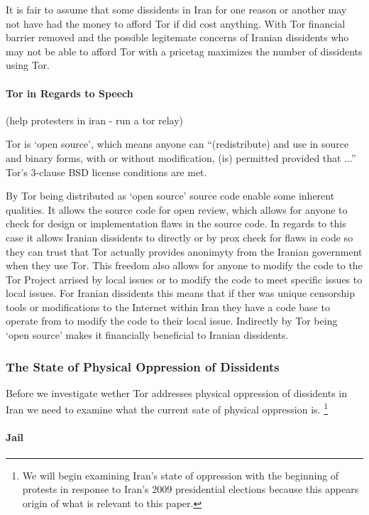 \documentclass[11pt]{article}
\begin{document}
\begin{multicols}{2}
It is fair to assume that some dissidents in Iran for one reason or another may
not have had the money to afford Tor if did cost anything. With Tor financial
barrier removed and the possible legitemate concerns of Iranian dissidents who
may not be able to afford Tor with a pricetag maximizes the number of dissidents
using Tor.

\paragraph{Tor in Regards to Speech}
(help protesters in iran - run a tor relay)

Tor is `open source', which means anyone can ``(redistribute) and use in source and
binary forms, with or without modification, (is) permitted provided that ...'' 
Tor's 3-clause BSD license conditions are met. \cite{BSD:3-ClauseLicense,
TOR:Download, TOR:BSD-License} 

By Tor being distributed as `open source' source code enable some inherent
qualities. It allows the source code for open review, which allows for anyone to
check for design or implementation flaws in the source code. In regards to this
case it allows Iranian dissidents to directly or by prox check for flaws in code
so they can trust that Tor actually provides anonimyty from the Iranian
government when they use Tor. This freedom also allows for anyone to modify the
code to the Tor Project arrised by local issues or to modify the code to meet
specific issues to local issues. For Iranian dissidents this means that if ther
was unique censorship tools or modifications to the Internet within Iran they
have a code base to operate from to modify the code to their local issue.
Indirectly by Tor being `open source' makes it financially beneficial to Iranian
dissidents.

\subsubsection{The State of Physical Oppression of Dissidents}
Before we investigate wether Tor addresses physical oppression of dissidents in
Iran we need to examine what the current sate of physical oppression is.
\footnote{We will begin examining Iran's state of oppression with the beginning
of protests in response to Iran's 2009 presidential elections because this
appears origin of what is relevant to this paper.}

\paragraph{Jail}


\end{multicols}
\end{document}
